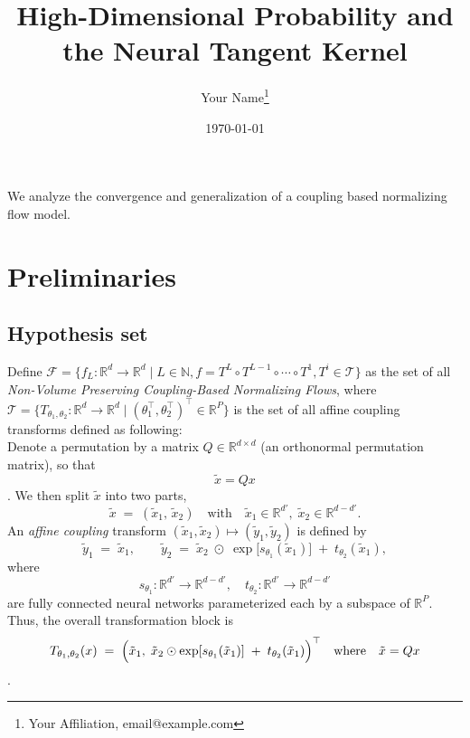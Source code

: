 \documentclass[11pt, a4paper]{article}
\title{High-Dimensional Probability and the Neural Tangent Kernel}
\author{Your Name\thanks{Your Affiliation, email@example.com}}
\date{\today}
\theoremstyle{definition}
\theoremstyle{remark}
\newcommand{\R}{\mathbb{R}}
\begin{document}
	
	\maketitle
	
	
	\begin{abstract}
		
	\end{abstract}
	
	
	We analyze the convergence and generalization of a coupling based normalizing flow model.
	
	\section{Preliminaries}
	
	\subsection{Hypothesis set}
	
	Define \(\mathcal{F} = \{f_L:\R^d \to \R^d \mid L \in \mathbb{N}, f = T^{L}\circ T^{L-1}\circ \cdots \circ T^{1}, T^{i} \in \mathcal{T}\}\) as the set of all \textit{Non-Volume Preserving Coupling-Based Normalizing Flows}, where \(\mathcal{T}=\{ T_{\theta_1, \theta_2}:\R^d \to \R^d \mid (\theta_1^\top,\theta_2^\top)^\top \in \R^P \}\) is the set of all affine coupling transforms defined as following:\\
	
	Denote a permutation by a matrix $Q \in \mathbb{R}^{d \times d}$ (an orthonormal permutation matrix), 
	so that
	\[
	\tilde{x} = Q x
	\].
	We then split $\tilde{x}$ into two parts, 
	\[
	\tilde{x} 
	\;=\; (\tilde{x}_1, \,\tilde{x}_2)
	\quad \text{with} \quad
	\tilde{x}_1 \in \mathbb{R}^{d'}, 
	\;\tilde{x}_2 \in \mathbb{R}^{d - d'}.
	\]
	An \emph{affine coupling} transform $(\tilde{x}_1, \tilde{x}_2) \mapsto (\tilde{y}_1, \tilde{y}_2)$ 
	is defined by
	\[
	\tilde{y}_1 
	\;=\; \tilde{x}_1,
	\qquad
	\tilde{y}_2 
	\;=\; \tilde{x}_2 \;\odot\; \exp\bigl[s_{\theta_1}(\tilde{x}_1)\bigr]
	\;+\; t_{\theta_2}(\tilde{x}_1),
	\]
	where 
	\[
	s_{\theta_1}: \mathbb{R}^{d'} \to \mathbb{R}^{d-d'}, 
	\quad
	t_{\theta_2}: \mathbb{R}^{d'} \to \mathbb{R}^{d-d'}
	\]
	are fully connected neural networks parameterized each by a subspace of $\R^P$. 
	Thus, the overall transformation block is 
	\[
	T_{\theta_1,\theta_2}(x) \;=\;
	\Bigl(
	\tilde{x}_1,\;
	\tilde{x}_2 \odot \exp[s_{\theta_1}(\tilde{x}_1)] \;+\; t_{\theta_2}(\tilde{x}_1)
	\Bigr)^\top
	\quad\text{where}\quad 
	\tilde{x} = Q x
	\].
	
\end{document}
